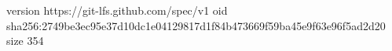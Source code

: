 version https://git-lfs.github.com/spec/v1
oid sha256:2749be3ec95e37d10dc1e04129817d1f84b473669f59ba45e9f63e96f5ad2d20
size 354
